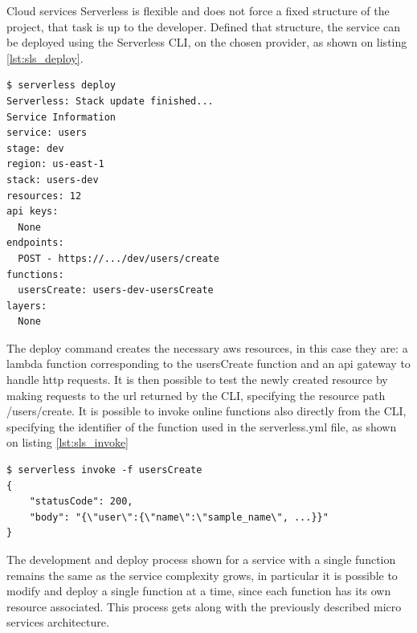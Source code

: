 \begin{chapter}{Cloud services}
    Serverless is flexible and does not force a fixed structure of the project, that
    task is up to the developer.
    Defined that structure, the service can be deployed using the Serverless CLI, on
    the chosen provider, as shown on listing \ref{lst:sls_deploy}.

    \bigskip
    \begin{lstlisting}[caption=Deploy command, label={lst:sls_deploy}]
$ serverless deploy
Serverless: Stack update finished...
Service Information
service: users
stage: dev
region: us-east-1
stack: users-dev
resources: 12
api keys:
  None
endpoints:
  POST - https://.../dev/users/create
functions:
  usersCreate: users-dev-usersCreate
layers:
  None
    \end{lstlisting}

    The deploy command creates the necessary aws resources, in this case they are:
    a lambda function corresponding to the usersCreate function and an api gateway to
    handle http requests.
    It is then possible to test the newly created resource by making requests to the
    url returned by the CLI, specifying the resource path /users/create.
    It is possible to invoke online functions also directly from the CLI,
    specifying the identifier of the function used in the serverless.yml file, as shown
    on listing \ref{lst:sls_invoke}

    \bigskip
    \begin{lstlisting}[caption=Invoke command, label={lst:sls_invoke}]
$ serverless invoke -f usersCreate
{
    "statusCode": 200,
    "body": "{\"user\":{\"name\":\"sample_name\", ...}}"
}
    \end{lstlisting}

    The development and deploy process shown for a service with a single function
    remains the same as the service complexity grows, in particular it is possible to
    modify and deploy a single function at a time, since each function has its own
    resource associated.
    This process gets along with the previously described micro services architecture.


\end{chapter}
